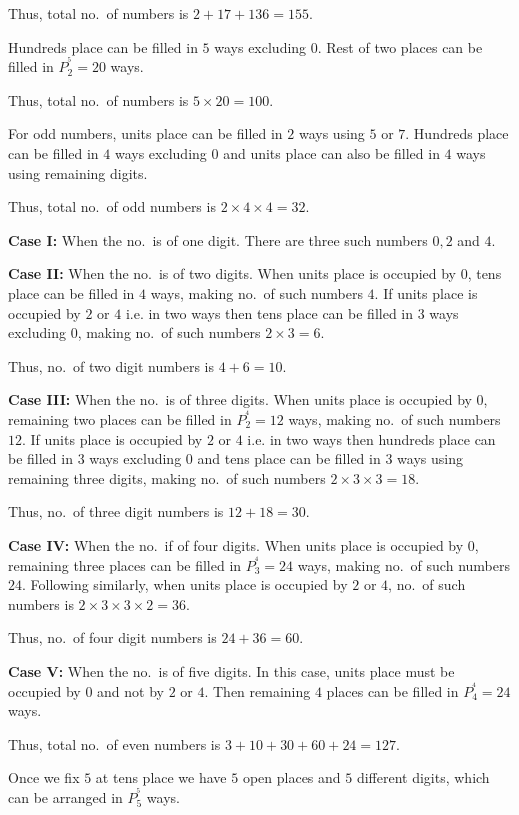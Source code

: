   Thus, total no.\ of numbers is $2 + 17 + 136 = 155$.
\item Hundreds place can be filled in $5$ ways excluding $0$. Rest of two places can be filled in $P_2^^5 =
  20$ ways.

  Thus, total no.\ of numbers is $5\times20 = 100$.

  For odd numbers, units place can be filled in $2$ ways using $5$ or $7$. Hundreds place can be filled in
  $4$ ways excluding $0$ and units place can also be filled in $4$ ways using remaining digits.

  Thus, total no.\ of odd numbers is $2\times4\times4 = 32$.
\item {\bf Case I:} When the no.\ is of one digit. There are three such numbers $0, 2$ and $4$.

  {\bf Case II:} When the no.\ is of two digits. When units place is occupied by $0$, tens place can be filled
  in $4$ ways, making no.\ of such numbers $4$. If units place is occupied by $2$ or $4$ i.e. in two ways then
  tens place can be filled in $3$ ways excluding $0$, making no.\ of such numbers $2\times3 = 6$.

  Thus, no.\ of two digit numbers is $4 + 6 = 10$.

  {\bf Case III:} When the no.\ is of three digits. When units place is occupied by $0$, remaining two
  places can be filled in $P_2^^4 = 12$ ways, making no.\ of such numbers $12$. If units place is occupied by
  $2$ or $4$ i.e. in two ways then hundreds place can be filled in $3$ ways excluding $0$ and tens place can
  be filled in $3$ ways using remaining three digits, making no.\ of such numbers $2\times3\times3 = 18$.

  Thus, no.\ of three digit numbers is $12 + 18 = 30$.

  {\bf Case IV:} When the no.\ if of four digits. When units place is occupied by $0$, remaining three places
  can be filled in $P_3^^4 = 24$ ways, making no.\ of such numbers $24$. Following similarly, when units
  place is occupied by $2$ or $4$, no.\ of such numbers is $2\times3\times3\times2 = 36$.

  Thus, no.\ of four digit numbers is $24 + 36 = 60$.

  {\bf Case V:} When the no.\ is of five digits. In this case, units place must be occupied by $0$ and not by
  $2$ or $4$. Then remaining $4$ places can be filled in $P_4^^4 = 24$ ways.

  Thus, total no.\ of even numbers is $3 + 10 + 30 + 60 + 24 = 127$.
\item Once we fix $5$ at tens place we have $5$ open places and $5$ different digits, which can be arranged
  in $P_5^^5$ ways.


